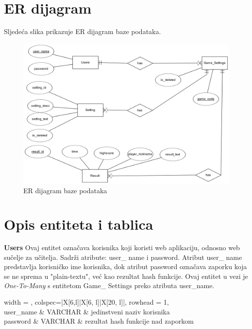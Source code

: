 \documentclass[times, utf8, zavrsni]{fer}
\begin{document}
	
	\section{ER dijagram}
		Sljedeća slika prikazuje ER dijagram baze podataka.
		\begin{figure}[H]
			\includegraphics[width=\linewidth]{"slike/ER.png"} 
			\centering
			\caption{ER dijagram baze podataka}
			\label{fig:erdijagram}
		\end{figure}

	
	\section{Opis entiteta i tablica}
			\textbf {Users} \hspace{5mm}
			{Ovaj entitet označava korisnika koji koristi web aplikaciju, odnosno web sučelje za učitelja. Sadrži atribute: user\_ name i password.
			Atribut user\_ name predstavlja korisničko ime korisnika, dok atribut password označava zaporku koja se ne sprema u "plain-textu", već kao 
			rezultat hash funkcije.
			Ovaj entitet u vezi je \textit{One-To-Many} s entitetom Game\_ Settings preko atributa user\_name.}
				
				\begin{longtblr}[
					label=none,
					entry=none
					]{
						width = \textwidth,
						colspec={|X[6,l]|X[6, l]|X[20, l]|}, 
						rowhead = 1,
					} %
					\hline {}	 \\ \hline[3pt]
					user\_name & VARCHAR	&  	jedinstveni naziv korisnika  	\\ \hline
					password	& VARCHAR &  rezultat hash funkcije nad zaporkom 	\\ \hline 
				\end{longtblr}
\end{document}

